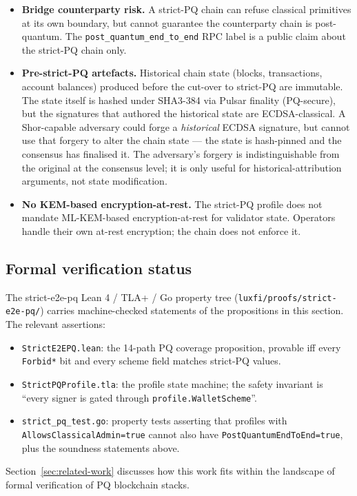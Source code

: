 \begin{itemize}[leftmargin=2em,nosep]
  \item \textbf{Bridge counterparty risk.} A strict-PQ chain can refuse
    classical primitives at its own boundary, but cannot guarantee the
    counterparty chain is post-quantum. The \texttt{post\_quantum\_end\_to\_end}
    RPC label is a public claim about the strict-PQ chain only.
  \item \textbf{Pre-strict-PQ artefacts.} Historical chain state (blocks,
    transactions, account balances) produced before the cut-over to
    strict-PQ are immutable. The state itself is hashed under SHA3-384 via
    Pulsar finality (PQ-secure), but the signatures that authored the
    historical state are ECDSA-classical. A Shor-capable adversary could
    forge a \emph{historical} ECDSA signature, but cannot use that
    forgery to alter the chain state --- the state is hash-pinned and
    the consensus has finalised it. The adversary's forgery is
    indistinguishable from the original at the consensus level; it is
    only useful for historical-attribution arguments, not state
    modification.
  \item \textbf{No KEM-based encryption-at-rest.} The strict-PQ profile
    does not mandate ML-KEM-based encryption-at-rest for validator state.
    Operators handle their own at-rest encryption; the chain does not
    enforce it.
\end{itemize}

\subsection{Formal verification status}

The strict-e2e-pq Lean 4 / TLA+ / Go property tree
(\texttt{luxfi/proofs/strict-e2e-pq/}) carries machine-checked statements
of the propositions in this section. The relevant assertions:

\begin{itemize}[leftmargin=2em,nosep]
  \item \texttt{StrictE2EPQ.lean}: the 14-path PQ coverage proposition,
    provable iff every \texttt{Forbid*} bit and every scheme field matches
    strict-PQ values.
  \item \texttt{StrictPQProfile.tla}: the profile state machine; the
    safety invariant is ``every signer is gated through
    \texttt{profile.WalletScheme}''.
  \item \texttt{strict\_pq\_test.go}: property tests asserting that
    profiles with \texttt{AllowsClassicalAdmin=true} cannot also have
    \texttt{PostQuantumEndToEnd=true}, plus the soundness
    statements above.
\end{itemize}

Section~\ref{sec:related-work} discusses how this work fits within the
landscape of formal verification of PQ blockchain stacks.
